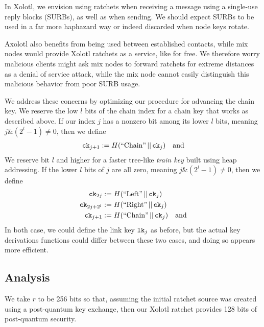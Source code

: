 \documentclass[twoside,letterpaper]{llncs}
\def\mathcomma{}
\begin{document}
In Xolotl, we envision using ratchets when receiving a message 
using a single-use reply blocks (SURBs), as well as when sending.
We should expect SURBs to be used in a far more haphazard way or
indeed discarded when node keys rotate.  

Axolotl also benefits from being used between established contacts,
while mix nodes would provide Xolotl ratchets as a service, like
for free.  We therefore worry malicious clients might ask mix nodes
to forward ratchets for extreme distances as a denial of service
attack, while the mix node cannot easily distinguish this malicious
behavior from poor SURB usage.

We address these concerns by optimizing our procedure for advancing
the chain key.  We reserve the low $l$ bits of the chain index
for a chain key that works as described above.  
If our index $j$ has a nonzero bit among its lower $l$ bits,
meaning $j \& (2^l-1) \neq 0$, then
we define
\[ \begin{aligned}
 \ck_{j+1} &:= H(\textrm{``Chain''} \,||\, \ck_j) \quad\textrm{and} \\ %
\end{aligned} \]
We reserve bit $l$ and higher for a faster tree-like {\it train key}
built using heap addressing.  If the lower $l$ bits of $j$ are
all zero, meaning $j \& (2^l-1) \neq 0$, then we define 
\[ \begin{aligned}
 \ck_{2j} &:= H(\textrm{``Left''} \,||\, \ck_j) \mathcomma \\
 \ck_{2j+2^l} &:= H(\textrm{``Right''} \,||\, \ck_j) \mathcomma \\
 \ck_{j+1} &:= H(\textrm{``Chain''} \,||\, \ck_j) \quad\textrm{and} \\
\end{aligned} \]
In both case, we could define the link key $\texttt{lk}_j$ as before, but
the actual key derivations functions could differ between these two
cases, and doing so appears more efficient.


\subsection{Analysis}

We take $r$ to be 256 bits so that, assuming the initial ratchet
source was created using a post-quantum key exchange, then our
Xolotl ratchet provides 128 bits of post-quantum security.
\end{document}
